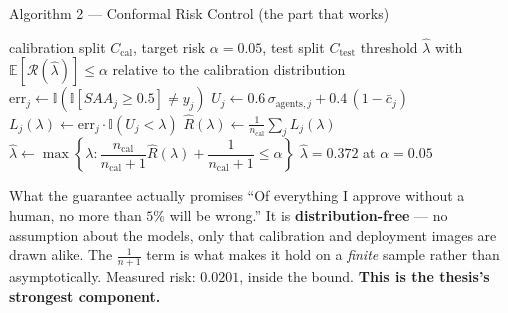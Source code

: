 \documentclass[aspectratio=169,11pt]{beamer}
\begin{document}
\begin{frame}{Algorithm 2 --- Conformal Risk Control (the part that works)}
\tiny
\begin{algorithmic}[1]
\Require calibration split $C_{\text{cal}}$, target risk $\alpha = 0.05$, test split $C_{\text{test}}$
\Ensure threshold $\hat\lambda$ with $\mathbb{E}[\mathcal{R}(\hat\lambda)] \le \alpha$ relative to the calibration distribution
  \State $\text{err}_j \leftarrow \mathbb{I}(\mathbb{I}[SAA_j \ge 0.5] \ne y_j)$ 
  \State $U_j \leftarrow 0.6\,\sigma_{\text{agents},j} + 0.4\,(1-\bar{c}_j)$
\EndFor
{}
  \State $L_j(\lambda) \leftarrow \text{err}_j \cdot \mathbb{I}(U_j < \lambda)$ 
  \State $\hat{R}(\lambda) \leftarrow \frac{1}{n_{\text{cal}}}\sum_j L_j(\lambda)$
\EndFor
\State $\hat\lambda \leftarrow \max\left\{\lambda : \dfrac{n_{\text{cal}}}{n_{\text{cal}}+1}\hat{R}(\lambda) + \dfrac{1}{n_{\text{cal}}+1} \le \alpha\right\}$ 
\State \Return $\hat\lambda = 0.372$ at $\alpha = 0.05$
\end{algorithmic}
\vspace{1mm}
\begin{exampleblock}{\scriptsize What the guarantee actually promises}
\scriptsize ``Of everything I approve without a human, no more than $5\%$ will be wrong.'' It is \textbf{distribution-free} --- no assumption about the models, only that calibration and deployment images are drawn alike. The $\frac{1}{n+1}$ term is what makes it hold on a \emph{finite} sample rather than asymptotically. Measured risk: $\mathbf{0.0201}$, inside the bound. \textbf{This is the thesis's strongest component.}
\end{exampleblock}
\end{frame}
\end{document}
